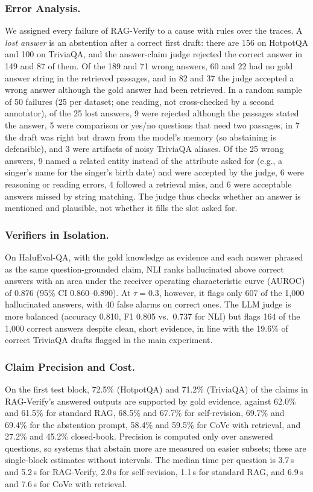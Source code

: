 \documentclass{svproc}
\begin{document}
\subsubsection{Error Analysis.} We assigned every failure of RAG-Verify to a cause with rules over the traces. A \emph{lost answer} is an abstention after a correct first draft: there are 156 on HotpotQA and 100 on TriviaQA, and the answer-claim judge rejected the correct answer in 149 and 87 of them. Of the 189 and 71 wrong answers, 60 and 22 had no gold answer string in the retrieved passages, and in 82 and 37 the judge accepted a wrong answer although the gold answer had been retrieved. In a random sample of 50 failures (25 per dataset; one reading, not cross-checked by a second annotator), of the 25 lost answers, 9 were rejected although the passages stated the answer, 5 were comparison or yes/no questions that need two passages, in 7 the draft was right but drawn from the model's memory (so abstaining is defensible), and 3 were artifacts of noisy TriviaQA aliases. Of the 25 wrong answers, 9 named a related entity instead of the attribute asked for (e.g., a singer's name for the singer's birth date) and were accepted by the judge, 6 were reasoning or reading errors, 4 followed a retrieval miss, and 6 were acceptable answers missed by string matching. The judge thus checks whether an answer is mentioned and plausible, not whether it fills the slot asked for.

\subsubsection{Verifiers in Isolation.} On HaluEval-QA, with the gold knowledge as evidence and each answer phrased as the same question-grounded claim, NLI ranks hallucinated above correct answers with an area under the receiver operating characteristic curve (AUROC) of 0.876 (95\% CI 0.860--0.890). At $\tau=0.3$, however, it flags only 607 of the 1{,}000 hallucinated answers, with 40 false alarms on correct ones. The LLM judge is more balanced (accuracy 0.810, F1 0.805 vs.\ 0.737 for NLI) but flags 164 of the 1{,}000 correct answers despite clean, short evidence, in line with the 19.6\% of correct TriviaQA drafts flagged in the main experiment.

\subsubsection{Claim Precision and Cost.} On the first test block, 72.5\% (HotpotQA) and 71.2\% (TriviaQA) of the claims in RAG-Verify's answered outputs are supported by gold evidence, against 62.0\% and 61.5\% for standard RAG, 68.5\% and 67.7\% for self-revision, 69.7\% and 69.4\% for the abstention prompt, 58.4\% and 59.5\% for CoVe with retrieval, and 27.2\% and 45.2\% closed-book. Precision is computed only over answered questions, so systems that abstain more are measured on easier subsets; these are single-block estimates without intervals. The median time per question is 3.7\,s and 5.2\,s for RAG-Verify, 2.0\,s for self-revision, 1.1\,s for standard RAG, and 6.9\,s and 7.6\,s for CoVe with retrieval.
\end{document}
